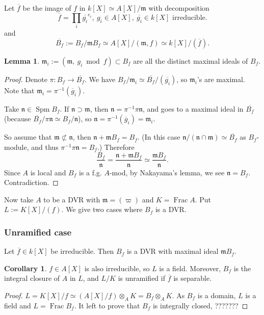 \documentclass{article}
\theoremstyle{definition}
\newtheorem{lemma}{Lemma}[section]
\newtheorem{corollary}{Corollary}[section]
\theoremstyle{remark}
\renewcommand{\bar}{\overline}
\DeclareMathOperator{\spm}{Spm} %
\DeclareMathOperator{\Frac}{Frac}
\begin{document}
Let $\bar{f}$ be the image of $f$ in $k[X] \simeq A[X]/\mathfrak{m}$ with decomposition \[\bar{f} = \prod_{i}\bar{g_i}^{e_i},\ g_i\in A[X],\ \bar{g_i}\in k[X]\text{ irreducible.}\]
and \[\bar{B_f} := B_f/\mathfrak{m}B_f \simeq A[X]/(\mathfrak{m}, f) \simeq k[X]/(\bar{f}).\]
\begin{lemma}
    $\mathfrak{m}_i := (\mathfrak{m},\ g_i\bmod f)\subset B_f$ are all the distinct maximal ideals of $B_f$.
\end{lemma}
\begin{proof}
    Denote $\pi : B_f\to\bar{B_f}$. We have $B_f/\mathfrak{m}_i \simeq \bar{B_f}/(\bar{g_i})$, so $\mathfrak{m}_i$'s are maximal.
    Note that $\mathfrak{m}_i = \pi^{-1}(\bar{g}_i)$.

    Take $\mathfrak{n}\in\spm B_f$.
    If $\mathfrak{n}\supset\mathfrak{m}$, then $\mathfrak{n} = \pi^{-1}\pi\mathfrak{n}$,
    and goes to a maximal ideal in $\bar{B_f}$ (because $\bar{B_f}/\pi\mathfrak{n} \simeq B_f/\mathfrak{n}$),
    so $\mathfrak{n} = \pi^{-1}(\bar{g}_i) = \mathfrak{m}_i$.

    So assume that $\mathfrak{m}\not\subset\mathfrak{n}$, then $\mathfrak{n} + \mathfrak{m}B_f = B_f$.
    (In this case $\mathfrak{n}/(\mathfrak{n\cap m})\simeq \bar{B_f}$ as $B_f$-module, and thus $\pi^{-1}\pi\mathfrak{n} = B_f$.)
    Therefore \[\frac{B_f}{\mathfrak{n}} = \frac{\mathfrak{n}+\mathfrak{m}B_f}{\mathfrak{n}} \simeq \frac{\mathfrak{m}B_f}{\mathfrak{n}}.\]
    Since $A$ is local and $B_f$ is a f.g. $A$-mod, by Nakayama's lemma, we see $\mathfrak{n} = B_f$. Contradiction.


\end{proof}

Now take $A$ to be a DVR with $\mathfrak{m} = (\varpi)$ and $K = \Frac A$. Put $L := K[X]/(f)$.
We give two cases where $B_f$ is a DVR.

\subsubsection*{Unramified case}
Let $\bar{f}\in k[X]$ be irreducible. Then $B_f$ is a DVR with maximal ideal $\mathfrak{m}B_f$.
\begin{corollary}
    $f\in A[X]$ is also irreducible, so $L$ is a field.
    Moreover, $B_f$ is the integral closure of $A$ in $L$, and $L/K$ is unramified if $\bar{f}$ is separable.
\end{corollary}
\begin{proof}
    $L = K[X]/f \simeq \left( A[X]/f \right)\otimes_{A} K = B_f\otimes_A K$.
    As $B_f$ is a domain, $L$ is a field and $L = \Frac B_f$.
    It left to prove that $B_f$ is integrally closed, ???????
\end{proof}
\end{document}
